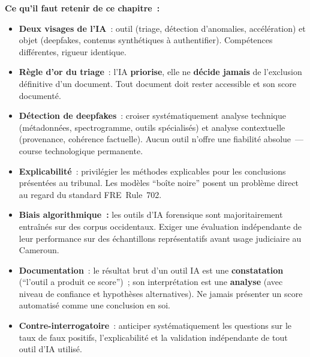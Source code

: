 \begin{boxresume}
\textbf{Ce qu'il faut retenir de ce chapitre~:}
\begin{itemize}
    \item \textbf{Deux visages de l'IA}~: outil (triage, détection
          d'anomalies, accélération) et objet (deepfakes, contenus
          synthétiques à authentifier). Compétences différentes,
          rigueur identique.

    \item \textbf{Règle d'or du triage}~: l'IA \textbf{priorise},
          elle ne \textbf{décide jamais} de l'exclusion définitive
          d'un document. Tout document doit rester accessible
          et son score documenté.

    \item \textbf{Détection de deepfakes}~: croiser systématiquement
          analyse technique (métadonnées, spectrogramme, outils
          spécialisés) et analyse contextuelle (provenance,
          cohérence factuelle). Aucun outil n'offre une fiabilité
          absolue~--- course technologique permanente.

    \item \textbf{Explicabilité}~: privilégier les méthodes
          explicables pour les conclusions présentées au tribunal.
          Les modèles ``boîte noire'' posent un problème direct
          au regard du standard FRE~Rule~702.

    \item \textbf{Biais algorithmique~:} les outils d'IA forensique
          sont majoritairement entraînés sur des corpus occidentaux.
          Exiger une évaluation indépendante de leur performance
          sur des échantillons représentatifs avant usage judiciaire
          au Cameroun.

    \item \textbf{Documentation}~: le résultat brut d'un outil IA
          est une \textbf{constatation} (``l'outil a produit ce
          score'')~; son interprétation est une \textbf{analyse}
          (avec niveau de confiance et hypothèses alternatives).
          Ne jamais présenter un score automatisé comme une
          conclusion en soi.

    \item \textbf{Contre-interrogatoire}~: anticiper systématiquement
          les questions sur le taux de faux positifs, l'explicabilité
          et la validation indépendante de tout outil d'IA utilisé.
\end{itemize}
\end{boxresume}

